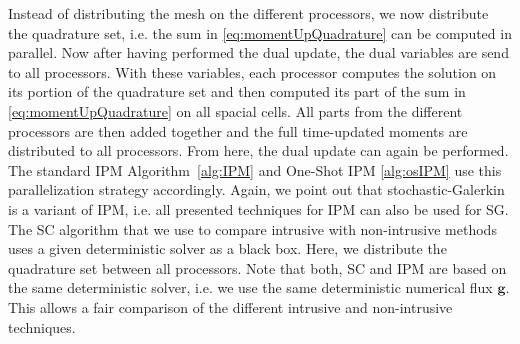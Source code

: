 Instead of distributing the mesh on the different processors, we now distribute the quadrature set, i.e. the sum in \eqref{eq:momentUpQuadrature} can be computed in parallel. Now after having performed the dual update, the dual variables are send to all processors. With these variables, each processor computes the solution on its portion of the quadrature set and then computed its part of the sum in \eqref{eq:momentUpQuadrature} on all spacial cells. All parts from the different processors are then added together and the full time-updated moments are distributed to all processors. From here, the dual update can again be performed. The standard IPM Algorithm~\ref{alg:IPM} and One-Shot IPM \ref{alg:osIPM} use this parallelization strategy accordingly. Again, we point out that stochastic-Galerkin is a variant of IPM, i.e. all presented techniques for IPM can also be used for SG. The SC algorithm that we use to compare intrusive with non-intrusive methods uses a given deterministic solver as a black box. Here, we distribute the quadrature set between all processors. Note that both, SC and IPM are based on the same deterministic solver, i.e. we use the same deterministic numerical flux $\bm g$. This allows a fair comparison of the different intrusive and non-intrusive techniques.
